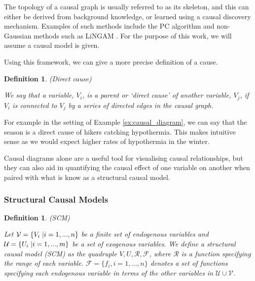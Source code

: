 \documentclass{article}
\newtheorem{defn}[theorem]{Definition}
\begin{document}
\noindent The topology of a causal graph is usually referred to as its skeleton, and this can either be derived from background knowledge, or learned using a causal discovery mechanism. Examples of such methods include the PC algorithm \cite{spirtes2000causation} and non-Gaussian methods such as LiNGAM \cite{shimizu2006linear}. For the purpose of this work, we will assume a causal model is given. 

Using this framework, we can give a more precise definition of a cause. 

\begin{defn} 
(Direct cause) \cite{pearl2018book}

    \noindent We say that a variable, $V_i$, is a parent or `direct cause' of another variable, $V_j$, if $V_i$ is  connected to $V_j$ by a series of directed edges in the causal graph.
\end{defn}


\noindent For example in the setting of Example \ref{ex:causal_diagram}, we can say that the season is a direct cause of hikers catching hypothermia. This makes intuitive sense as we would expect higher rates of hypothermia in the winter. 

Causal diagrams alone are a useful tool for visualising causal relationships, but they can also aid in quantifying the causal effect of one variable on another when paired with what is know as a structural causal model.

\subsubsection{Structural Causal Models}

\label{sec: SCM}


\begin{defn} (SCM) \cite{YT}

\noindent Let $\mathcal{V} = \{V_i \hspace{1mm}| i = 1,...,n\}$ be a finite set of endogenous variables and $\mathcal{U} = \{U_i \hspace{1mm}| i = 1,...,m\}$ be a set of exogenous variables. We define a structural causal model (SCM) as the quadruple ${V,U,\mathcal{R},\mathcal{F}}$, where $\mathcal{R}$ is a function specifying the range of each variable. $\mathcal{F} = \{f_i, i = 1,...,n\} $ denotes a set of functions specifying each endogenous variable in terms of the other variables in $\mathcal{U} \cup \mathcal{V}$. 
\end{defn}
\end{document}
